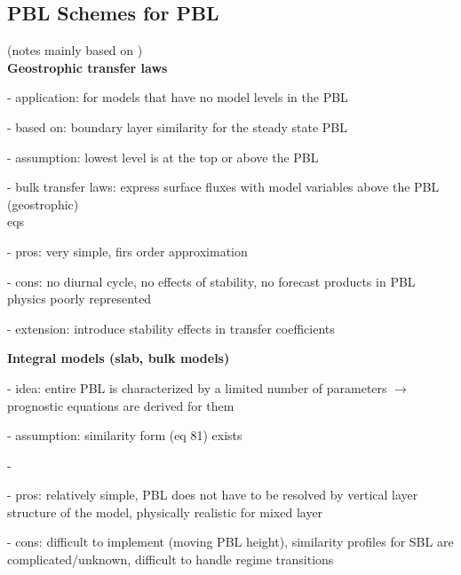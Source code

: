 \documentclass[11pt]{article}
\begin{document}
	\subsection{PBL Schemes for PBL}
	(notes mainly based on \citep{ECMWF2002}) \\
	
	\textbf{Geostrophic transfer laws}
	\begin{compactenum}
		\item[-] application: for models that have no model levels in the PBL
		\item[-] based on: boundary layer similarity for the steady state PBL
		\item[-] assumption: lowest level is at the top or above the PBL
		\item[-] bulk transfer laws: express surface fluxes with model variables above the PBL (geostrophic) \\
		eqs
		\item[-] pros: very simple, firs order approximation
		\item[-] cons: no diurnal cycle, no effects of stability, no forecast products in PBL physics poorly represented
		\item[-] extension: introduce stability effects in transfer coefficients \\
	\end{compactenum}

	\textbf{Integral models (slab, bulk models)} 
	\begin{compactenum}
		\item[-] idea: entire PBL is characterized by a limited number of parameters $\rightarrow$ prognostic equations are derived for them
		\item[-] assumption: similarity form (eq 81) exists
		\item[-]
		\item[-] pros: relatively simple, PBL does not have to be resolved by vertical layer structure of the model, physically realistic for mixed layer
		\item[-] cons: difficult to implement (moving PBL height), similarity profiles for SBL are complicated/unknown, difficult to handle regime transitions \\
	\end{compactenum}
\end{document}
